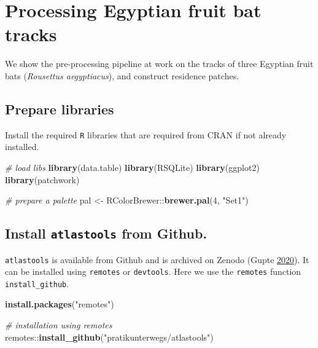 \documentclass[]{scrartcl}
\newenvironment{Shaded}{}{}
\newcommand{\CommentTok}[1]{\textcolor[rgb]{0.38,0.63,0.69}{\textit{#1}}}
\newcommand{\DecValTok}[1]{\textcolor[rgb]{0.25,0.63,0.44}{#1}}
\newcommand{\KeywordTok}[1]{\textcolor[rgb]{0.00,0.44,0.13}{\textbf{#1}}}
\newcommand{\NormalTok}[1]{#1}
\newcommand{\OperatorTok}[1]{\textcolor[rgb]{0.40,0.40,0.40}{#1}}
\newcommand{\StringTok}[1]{\textcolor[rgb]{0.25,0.44,0.63}{#1}}
\begin{document}
\hypertarget{processing-egyptian-fruit-bat-tracks}{%
\section{Processing Egyptian fruit bat tracks}\label{processing-egyptian-fruit-bat-tracks}}

We show the pre-processing pipeline at work on the tracks of three Egyptian fruit bats (\emph{Rousettus aegyptiacus}), and construct residence patches.

\hypertarget{prepare-libraries-1}{%
\subsection{Prepare libraries}\label{prepare-libraries-1}}

Install the required \texttt{R} libraries that are required from CRAN if not already installed.

\begin{Shaded}
\begin{Highlighting}[]
\CommentTok{# load libs}
\KeywordTok{library}\NormalTok{(data.table)}
\KeywordTok{library}\NormalTok{(RSQLite)}
\KeywordTok{library}\NormalTok{(ggplot2)}
\KeywordTok{library}\NormalTok{(patchwork)}

\CommentTok{# prepare a palette}
\NormalTok{pal <-}\StringTok{ }\NormalTok{RColorBrewer}\OperatorTok{::}\KeywordTok{brewer.pal}\NormalTok{(}\DecValTok{4}\NormalTok{, }\StringTok{"Set1"}\NormalTok{)}
\end{Highlighting}
\end{Shaded}

\hypertarget{install-atlastools-from-github.}{%
\subsection{\texorpdfstring{Install \texttt{atlastools} from Github.}{Install atlastools from Github.}}\label{install-atlastools-from-github.}}

\texttt{atlastools} is available from Github and is archived on Zenodo (Gupte \protect\hyperlink{ref-gupte2020a}{2020}).
It can be installed using \texttt{remotes} or \texttt{devtools}. Here we use the \texttt{remotes} function \texttt{install\_github}.

\begin{Shaded}
\begin{Highlighting}[]
\KeywordTok{install.packages}\NormalTok{(}\StringTok{"remotes"}\NormalTok{)}

\CommentTok{# installation using remotes}
\NormalTok{remotes}\OperatorTok{::}\KeywordTok{install_github}\NormalTok{(}\StringTok{"pratikunterwegs/atlastools"}\NormalTok{)}
\end{Highlighting}
\end{Shaded}
\end{document}
